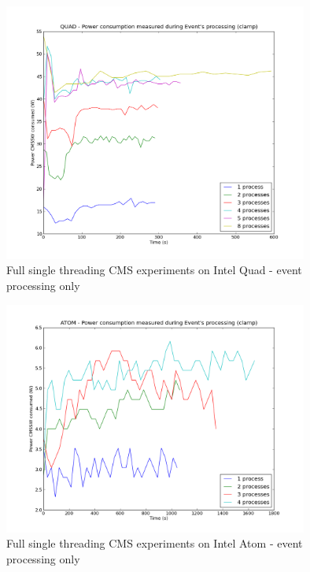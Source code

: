 \begin{figure}[h!]
  \centering
    \includegraphics[width=100mm]{"img/aalto/aalto_quadEvents"}
    \caption{Full single threading CMS experiments on Intel Quad - event
    \label{fig:aalto_quad_events}
processing only}
\end{figure}

\begin{figure}[h!]
  \centering
    \includegraphics[width=100mm]{"img/aalto/aalto_atomEvents"}
    \caption{Full single threading CMS experiments on Intel Atom - event
    \label{fig:aalto_atom_events}
processing only}
\end{figure}


